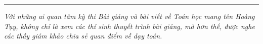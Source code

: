 \vspace*{-10pt}
\rule{1\linewidth}{0.1pt}
\begingroup
{}
\centering
\endgroup
\vspace*{80pt}

\textit{Với những ai quan tâm kỳ thi Bài giảng và bài viết về Toán học mang tên Hoàng Tụy, không chỉ là xem các thí sinh thuyết trình bài giảng, mà hơn thế, được nghe các thầy giám khảo chia sẻ quan điểm về dạy toán.}

